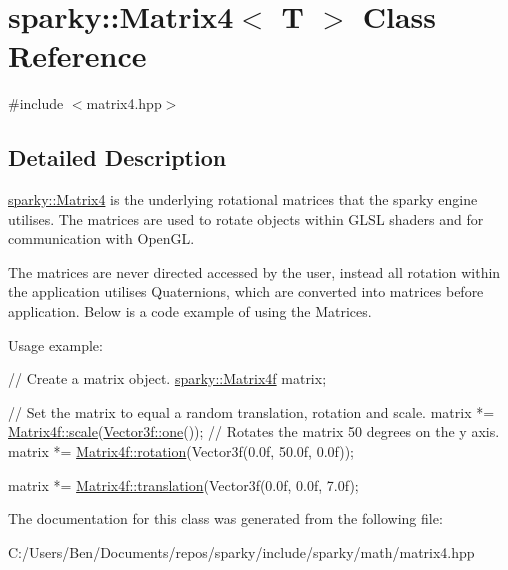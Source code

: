 \hypertarget{classsparky_1_1_matrix4_3_01_t_01_4}{}\section{sparky\+:\+:Matrix4$<$ T $>$ Class Reference}
\label{classsparky_1_1_matrix4_3_01_t_01_4}


{\ttfamily \#include $<$matrix4.\+hpp$>$}



\subsection{Detailed Description}
\hyperlink{classsparky_1_1_matrix4}{sparky\+::\+Matrix4} is the underlying rotational matrices that the sparky engine utilises. The matrices are used to rotate objects within G\+L\+SL shaders and for communication with Open\+GL.

The matrices are never directed accessed by the user, instead all rotation within the application utilises Quaternions, which are converted into matrices before application. Below is a code example of using the Matrices.

Usage example\+: 
\begin{DoxyCode}
\textcolor{comment}{// Create a matrix object.}
\hyperlink{classsparky_1_1_matrix4}{sparky::Matrix4f} matrix;

\textcolor{comment}{// Set the matrix to equal a random translation, rotation and scale.}
matrix *= \hyperlink{classsparky_1_1_matrix4_ada9820297b26753f42b3c2e59bd299a0}{Matrix4f::scale}(\hyperlink{classsparky_1_1_vector3_a4c14579a75db2a70f83868e4f45597a1}{Vector3f::one}());
\textcolor{comment}{// Rotates the matrix 50 degrees on the y axis.}
matrix *= \hyperlink{classsparky_1_1_matrix4_a7eb1835e9c95d6aa63641309033717df}{Matrix4f::rotation}(Vector3f(0.0f, 50.0f, 0.0f));

matrix *= \hyperlink{classsparky_1_1_matrix4_a784f547051f224f748058b573ed87d38}{Matrix4f::translation}(Vector3f(0.0f, 0.0f, 7.0f);
\end{DoxyCode}
 

The documentation for this class was generated from the following file\+:\begin{DoxyCompactItemize}
\item 
C\+:/\+Users/\+Ben/\+Documents/repos/sparky/include/sparky/math/matrix4.\+hpp\end{DoxyCompactItemize}
